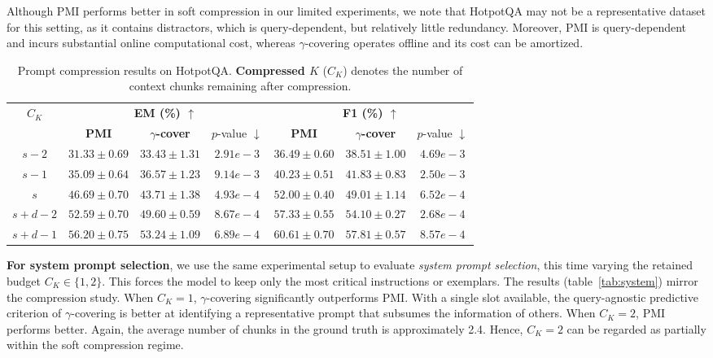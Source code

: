 \documentclass{article} %
\theoremstyle{definition}
\begin{document}
Although PMI performs better in soft compression in our limited experiments, we note that HotpotQA may not be a representative dataset for this setting, as it contains distractors, which is query-dependent, but relatively little redundancy. Moreover, PMI is query-dependent and incurs substantial online computational cost, whereas $\gamma$-covering operates offline and its cost can be amortized.

\begin{table}[h]
\centering
\caption{\small Prompt compression results on HotpotQA.
\textbf{Compressed $K$} ($C_K$) denotes the number of context chunks remaining after compression.} 
\label{tab:compression}
\begin{tabular}{c|ccc|ccc}
\toprule
\multirow{2}{*}{\small \textbf{$C_K$}} & \multicolumn{3}{c|}{\small \textbf{EM (\%) $\uparrow$}} & \multicolumn{3}{c}{\small \textbf{F1 (\%) $\uparrow$}} \\
 & \small \textbf{PMI} & \small \textbf{$\gamma$-cover} & \small $p$-value $\downarrow$ & \small \textbf{PMI} & \small \textbf{$\gamma$-cover} & \small $p$-value $\downarrow$ \\
\midrule
\small $s-2$ & \small $31.33\pm 0.69$ & \small $33.43\pm 1.31 $ & \small $2.91e-3 $ & \small $36.49\pm 0.60$ & \small $38.51\pm 1.00 $ & \small $4.69e-3$ \\
\midrule
\small $s-1$ & \small $35.09\pm 0.64 $ & \small $36.57\pm 1.23$ & \small $9.14e-3 $ & \small $40.23\pm 0.51 $ & \small $41.83\pm 0.83 $ & \small $2.50e-3 $ \\
\midrule
\small $s$ & \small $46.69\pm 0.70 $ & \small $43.71\pm 1.38 $ & \small $4.93e-4 $ & \small $52.00\pm 0.40 $ & \small $49.01\pm 1.14$ & \small $6.52e-4 $ \\
\midrule
\small $s+d-2$ & \small $52.59\pm 0.70 $ & \small $49.60\pm 0.59 $ & \small $8.67e-4 $ & \small $57.33\pm 0.55 $ & \small $54.10\pm 0.27 $ & \small $2.68e-4 $ \\
\midrule
\small $s+d-1$ & \small $56.20\pm 0.75 $ & \small $53.24\pm 1.09 $ & \small $6.89e-4 $ & \small $60.61\pm 0.70 $ & \small $57.81\pm 0.57 $ & \small $8.57e-4 $ \\
\bottomrule
\end{tabular}
\end{table}

\textbf{For system prompt selection}, we use the same experimental setup to evaluate \emph{system prompt selection}, this time varying the retained budget $C_K \in \{1,2\}$. This forces the model to keep only the most critical instructions or exemplars. The results (table~\ref{tab:system}) mirror the compression study. When $C_K = 1$, $\gamma$-covering significantly outperforms PMI. With a single slot available, the query-agnostic predictive criterion of $\gamma$-covering is better at identifying a representative prompt that subsumes the information of others. When $C_K = 2$, PMI performs better. Again, the average number of chunks in the ground truth is approximately 2.4. Hence, $C_K = 2$ can be regarded as partially within the soft compression regime.
\end{document}
